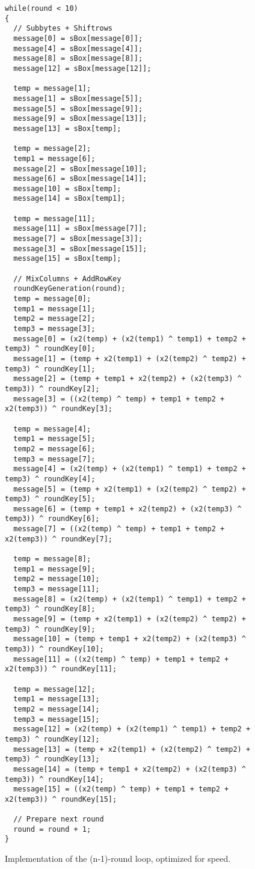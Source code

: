 \documentclass[Report.tex]{subfiles}
\begin{document}
\begin{figure}[h]
\begin{lstlisting}[basicstyle=\tiny]
while(round < 10)
{
  // Subbytes + Shiftrows	
  message[0] = sBox[message[0]];
  message[4] = sBox[message[4]];
  message[8] = sBox[message[8]];
  message[12] = sBox[message[12]];
  
  temp = message[1];
  message[1] = sBox[message[5]];
  message[5] = sBox[message[9]];
  message[9] = sBox[message[13]];
  message[13] = sBox[temp];
  
  temp = message[2];
  temp1 = message[6];
  message[2] = sBox[message[10]];
  message[6] = sBox[message[14]];
  message[10] = sBox[temp];
  message[14] = sBox[temp1];
 
  temp = message[11];
  message[11] = sBox[message[7]];
  message[7] = sBox[message[3]];
  message[3] = sBox[message[15]];
  message[15] = sBox[temp];
  
  // MixColumns + AddRowKey
  roundKeyGeneration(round);
  temp = message[0];
  temp1 = message[1];
  temp2 = message[2];
  temp3 = message[3];
  message[0] = (x2(temp) + (x2(temp1) ^ temp1) + temp2 + temp3) ^ roundKey[0];
  message[1] = (temp + x2(temp1) + (x2(temp2) ^ temp2) + temp3) ^ roundKey[1];
  message[2] = (temp + temp1 + x2(temp2) + (x2(temp3) ^ temp3)) ^ roundKey[2];
  message[3] = ((x2(temp) ^ temp) + temp1 + temp2 + x2(temp3)) ^ roundKey[3];
  
  temp = message[4];
  temp1 = message[5];
  temp2 = message[6];
  temp3 = message[7];
  message[4] = (x2(temp) + (x2(temp1) ^ temp1) + temp2 + temp3) ^ roundKey[4];
  message[5] = (temp + x2(temp1) + (x2(temp2) ^ temp2) + temp3) ^ roundKey[5];
  message[6] = (temp + temp1 + x2(temp2) + (x2(temp3) ^ temp3)) ^ roundKey[6];
  message[7] = ((x2(temp) ^ temp) + temp1 + temp2 + x2(temp3)) ^ roundKey[7];
  
  temp = message[8];
  temp1 = message[9];
  temp2 = message[10];
  temp3 = message[11];
  message[8] = (x2(temp) + (x2(temp1) ^ temp1) + temp2 + temp3) ^ roundKey[8];
  message[9] = (temp + x2(temp1) + (x2(temp2) ^ temp2) + temp3) ^ roundKey[9];
  message[10] = (temp + temp1 + x2(temp2) + (x2(temp3) ^ temp3)) ^ roundKey[10];
  message[11] = ((x2(temp) ^ temp) + temp1 + temp2 + x2(temp3)) ^ roundKey[11];
  
  temp = message[12];
  temp1 = message[13];
  temp2 = message[14];
  temp3 = message[15];
  message[12] = (x2(temp) + (x2(temp1) ^ temp1) + temp2 + temp3) ^ roundKey[12];
  message[13] = (temp + x2(temp1) + (x2(temp2) ^ temp2) + temp3) ^ roundKey[13];
  message[14] = (temp + temp1 + x2(temp2) + (x2(temp3) ^ temp3)) ^ roundKey[14];
  message[15] = ((x2(temp) ^ temp) + temp1 + temp2 + x2(temp3)) ^ roundKey[15];
  
  // Prepare next round
  round = round + 1;
}
\end{lstlisting}
\caption{\label{N1speed} Implementation of the (n-1)-round loop, optimized for speed.}
\end{figure}
\end{document}
